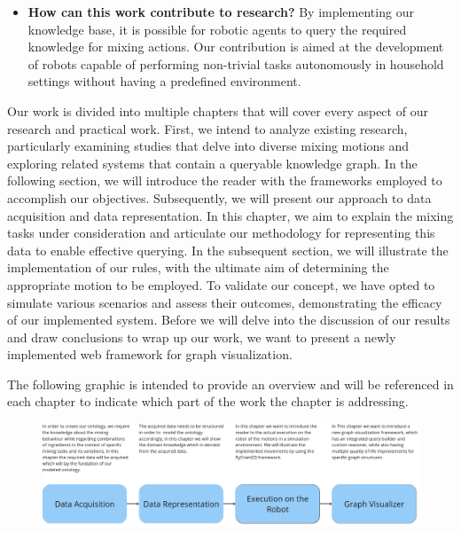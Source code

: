 \begin{itemize}
    \item \textbf{How can this work contribute to research?} By implementing our knowledge base, it is possible for robotic agents to query the required knowledge for mixing actions. Our contribution is aimed at the development of robots capable of performing non-trivial tasks autonomously in household settings without having a predefined environment.
\end{itemize}


Our work is divided into multiple chapters that will cover every aspect of our research and practical work.
First, we intend to analyze existing research, particularly examining studies that delve into diverse mixing motions and exploring related systems that contain a queryable knowledge graph.
In the following section, we will introduce the reader with the frameworks employed to accomplish our objectives.	
Subsequently, we will present our approach to data acquisition and data representation.
In this chapter, we aim to explain the mixing tasks under consideration and articulate our methodology for representing this data to enable effective querying.
In the subsequent section, we will illustrate the implementation of our rules, with the ultimate aim of determining the appropriate motion to be employed.
To validate our concept, we have opted to simulate various scenarios and assess their outcomes, demonstrating the efficacy of our implemented system.
Before we will delve into the discussion of our results and draw conclusions to wrap up our work, we want to present a newly implemented web framework for graph visualization.

The following graphic is intended to provide an overview and will be referenced in each chapter to indicate which part of the work the chapter is addressing.
\begin{figure}[H]
    \includegraphics[scale=0.22]{Graphics/structure.jpg}
\end{figure}